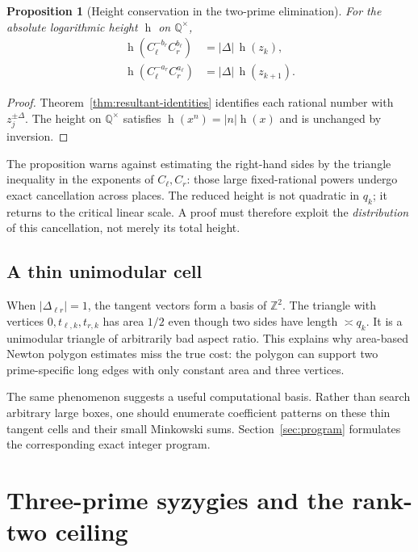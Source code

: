 \documentclass[11pt,oneside]{article}
\newtheorem{proposition}[theorem]{Proposition}
\theoremstyle{definition}
\theoremstyle{remark}
\newcommand{\Z}{\mathbb Z}
\newcommand{\Q}{\mathbb Q}
\newcommand{\height}{\operatorname{h}}
\begin{document}
\begin{proposition}[Height conservation in the two-prime elimination]
\label{prop:height-conservation}
For the absolute logarithmic height $\height$ on $\Q^\times$,
\begin{align}
 \height\!\left(C_\ell^{-b_r}C_r^{b_\ell}\right)
 &=|\Delta|\,\height(z_k),
 \label{eq:height-zk}\\
 \height\!\left(C_\ell^{-a_r}C_r^{a_\ell}\right)
 &=|\Delta|\,\height(z_{k+1}).
 \label{eq:height-zkp1}
\end{align}
\end{proposition}

\begin{proof}
Theorem~\ref{thm:resultant-identities} identifies each rational number with
$z_j^{\pm\Delta}$.  The height on $\Q^\times$ satisfies
$\height(x^n)=|n|\height(x)$ and is unchanged by inversion.
\end{proof}

The proposition warns against estimating the right-hand sides by the triangle inequality in
the exponents of $C_\ell,C_r$: those large fixed-rational powers undergo exact cancellation
across places.  The reduced height is not quadratic in $q_k$; it returns to the critical
linear scale.  A proof must therefore exploit the \emph{distribution} of this cancellation,
not merely its total height.

\subsection{A thin unimodular cell}

When $|\Delta_{\ell r}|=1$, the tangent vectors form a basis of $\Z^2$.  The triangle with
vertices $0,t_{\ell,k},t_{r,k}$ has area $1/2$ even though two sides have length
$\asymp q_k$.  It is a unimodular triangle of arbitrarily bad aspect ratio.  This explains
why area-based Newton polygon estimates miss the true cost: the polygon can support two
prime-specific long edges with only constant area and three vertices.

The same phenomenon suggests a useful computational basis.  Rather than search arbitrary
large boxes, one should enumerate coefficient patterns on these thin tangent cells and their
small Minkowski sums.  Section~\ref{sec:program} formulates the corresponding exact integer
program.

\section{Three-prime syzygies and the rank-two ceiling}
\label{sec:syzygy}
\end{document}
